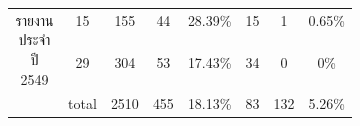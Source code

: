 \begin{table}[H]
\begin{tabular}{|c|c|c|p{0.1\linewidth}|p{0.1\linewidth}|c|p{0.1\linewidth}|p{0.1\linewidth}|}
            \multirow{2}{*}{รายงานประจำปี 2549}   & 15    & 155       & \multicolumn{1}{c|}{44 }         & \multicolumn{1}{c|}{28.39\%} & \multicolumn{1}{c|}{15}     & \multicolumn{1}{c|}{1  }             & \multicolumn{1}{c|}{0.65\% } \\ \cline{2-8} 
                                                & 29    & 304       & \multicolumn{1}{c|}{53 }         & \multicolumn{1}{c|}{17.43\%} & \multicolumn{1}{c|}{34}     & \multicolumn{1}{c|}{0  }             & \multicolumn{1}{c|}{0\%    } \\ \hline
                                                & total & 2510      & \multicolumn{1}{c|}{455}         & \multicolumn{1}{c|}{18.13\%} & \multicolumn{1}{c|}{83}     & \multicolumn{1}{c|}{132}             & \multicolumn{1}{c|}{5.26\% } \\ \hline
            \end{tabular}
            \end{table}

